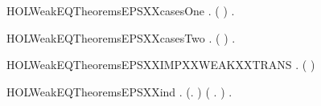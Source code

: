 \newcommand{\HOLWeakEQTheoremsEPSXXcases}{\UseVerbatim{HOLWeakEQTheoremsEPSXXcases}}
\begin{SaveVerbatim}{HOLWeakEQTheoremsEPSXXcasesOne}
\HOLTokenTurnstile{} \HOLSymConst{\HOLTokenForall{}} .    \HOLSymConst{\HOLTokenEquiv{}} ( \HOLSymConst{=} ) \HOLSymConst{\HOLTokenDisj{}} \HOLSymConst{\HOLTokenExists{}}.  \HOLTokenTransBegin\HOLConst{\ensuremath{\tau}}\HOLTokenTransEnd {} \HOLSymConst{\HOLTokenConj{}}   
\end{SaveVerbatim}
\newcommand{\HOLWeakEQTheoremsEPSXXcasesOne}{\UseVerbatim{HOLWeakEQTheoremsEPSXXcasesOne}}
\begin{SaveVerbatim}{HOLWeakEQTheoremsEPSXXcasesTwo}
\HOLTokenTurnstile{} \HOLSymConst{\HOLTokenForall{}} .    \HOLSymConst{\HOLTokenEquiv{}} ( \HOLSymConst{=} ) \HOLSymConst{\HOLTokenDisj{}} \HOLSymConst{\HOLTokenExists{}}.    \HOLSymConst{\HOLTokenConj{}}  \HOLTokenTransBegin\HOLConst{\ensuremath{\tau}}\HOLTokenTransEnd {}
\end{SaveVerbatim}
\newcommand{\HOLWeakEQTheoremsEPSXXcasesTwo}{\UseVerbatim{HOLWeakEQTheoremsEPSXXcasesTwo}}
\begin{SaveVerbatim}{HOLWeakEQTheoremsEPSXXIMPXXWEAKXXTRANS}
\HOLTokenTurnstile{} \HOLSymConst{\HOLTokenForall{}} .    \HOLSymConst{\HOLTokenImp{}} ( \HOLSymConst{=} ) \HOLSymConst{\HOLTokenDisj{}}  \HOLTokenWeakTransBegin\HOLConst{\ensuremath{\tau}}\HOLTokenWeakTransEnd {}
\end{SaveVerbatim}
\newcommand{\HOLWeakEQTheoremsEPSXXIMPXXWEAKXXTRANS}{\UseVerbatim{HOLWeakEQTheoremsEPSXXIMPXXWEAKXXTRANS}}
\begin{SaveVerbatim}{HOLWeakEQTheoremsEPSXXind}
\HOLTokenTurnstile{} \HOLSymConst{\HOLTokenForall{}}.
       (\HOLSymConst{\HOLTokenForall{}}.   ) \HOLSymConst{\HOLTokenConj{}} (\HOLSymConst{\HOLTokenForall{}}  .  \HOLTokenTransBegin\HOLConst{\ensuremath{\tau}}\HOLTokenTransEnd {} \HOLSymConst{\HOLTokenConj{}}    \HOLSymConst{\HOLTokenImp{}}   ) \HOLSymConst{\HOLTokenImp{}}
       \HOLSymConst{\HOLTokenForall{}} .    \HOLSymConst{\HOLTokenImp{}}   
\end{SaveVerbatim}
